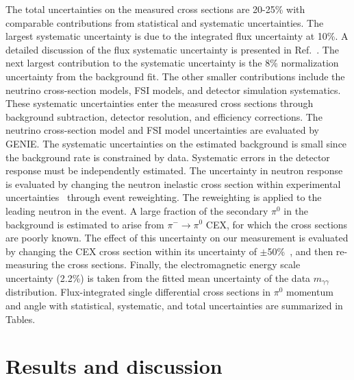 
The total uncertainties on the measured cross sections are 20-25\% with comparable 
contributions from statistical and systematic uncertainties. The largest systematic uncertainty 
is due to the integrated flux uncertainty at 10\%. A detailed discussion of the flux systematic 
uncertainty is presented in Ref.~\cite{nubarprl}. The next largest contribution to the 
systematic uncertainty is the 8\% normalization uncertainty from the background fit. 
The other smaller contributions include the neutrino cross-section models, FSI models, 
and detector simulation systematics. These systematic uncertainties enter the measured 
cross sections through background subtraction, detector resolution, and efficiency corrections. 
The neutrino cross-section model and FSI model uncertainties are evaluated by GENIE. 
The systematic uncertainties on the estimated background is small since the background rate is constrained by data. 
Systematic errors in the detector response must be independently estimated.
The uncertainty in neutron response is evaluated by changing the neutron inelastic 
cross section within experimental uncertainties~\cite{Abfalterer:2001gw,Schimmerling:1973bb,
Voss:1956,Slypen:1995fm,Franz:1989cf,Tippawan:2008xk,Bevilacqua:2013rfq,Zanelli:1981zz}
through event reweighting. The reweighting is applied to the leading neutron in the event. 
A large fraction of the secondary $\pi^0$ in the background is estimated to arise from $\pi^{-} \rightarrow \pi^0$
CEX, for which the cross sections are poorly known. The effect of this uncertainty on our 
measurement is evaluated by changing the CEX cross section within its 
uncertainty of $\pm$50\%~\cite{Ashery:1981tq,Bowles:1981,Jones:1993}, and then 
re-measuring the cross sections. Finally, the electromagnetic energy scale uncertainty (2.2\%) 
is taken from the fitted mean uncertainty of the data $m_{\gamma\gamma}$ distribution. 
Flux-integrated single differential cross sections in $\pi^0$ momentum and angle with 
statistical, systematic, and total uncertainties are summarized in 
Tables.


\section{Results and discussion}

